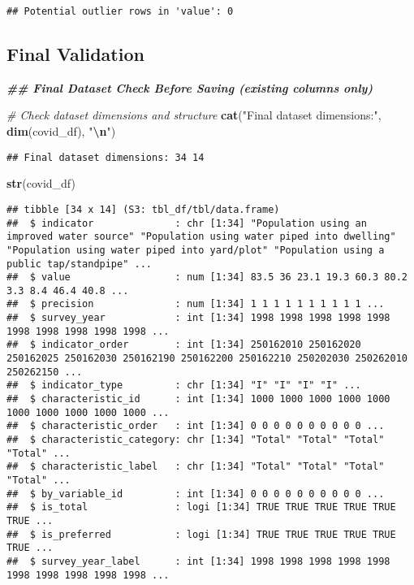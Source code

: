 \documentclass[
]{article}
\newenvironment{Shaded}{\begin{snugshade}}{\end{snugshade}}
\newcommand{\CommentTok}[1]{\textcolor[rgb]{0.56,0.35,0.01}{\textit{#1}}}
\newcommand{\DocumentationTok}[1]{\textcolor[rgb]{0.56,0.35,0.01}{\textbf{\textit{#1}}}}
\newcommand{\FunctionTok}[1]{\textcolor[rgb]{0.13,0.29,0.53}{\textbf{#1}}}
\newcommand{\NormalTok}[1]{#1}
\newcommand{\SpecialCharTok}[1]{\textcolor[rgb]{0.81,0.36,0.00}{\textbf{#1}}}
\newcommand{\StringTok}[1]{\textcolor[rgb]{0.31,0.60,0.02}{#1}}
\begin{document}
\begin{verbatim}
## Potential outlier rows in 'value': 0
\end{verbatim}

\subsection{Final Validation}\label{final-validation}

\begin{Shaded}
\begin{Highlighting}[]
\DocumentationTok{\#\# Final Dataset Check Before Saving (existing columns only)}

\CommentTok{\# Check dataset dimensions and structure}
\FunctionTok{cat}\NormalTok{(}\StringTok{"Final dataset dimensions:"}\NormalTok{, }\FunctionTok{dim}\NormalTok{(covid\_df), }\StringTok{"}\SpecialCharTok{\textbackslash{}n}\StringTok{"}\NormalTok{)}
\end{Highlighting}
\end{Shaded}

\begin{verbatim}
## Final dataset dimensions: 34 14
\end{verbatim}

\begin{Shaded}
\begin{Highlighting}[]
\FunctionTok{str}\NormalTok{(covid\_df)}
\end{Highlighting}
\end{Shaded}

\begin{verbatim}
## tibble [34 x 14] (S3: tbl_df/tbl/data.frame)
##  $ indicator              : chr [1:34] "Population using an improved water source" "Population using water piped into dwelling" "Population using water piped into yard/plot" "Population using a public tap/standpipe" ...
##  $ value                  : num [1:34] 83.5 36 23.1 19.3 60.3 80.2 3.3 8.4 46.4 40.8 ...
##  $ precision              : num [1:34] 1 1 1 1 1 1 1 1 1 1 ...
##  $ survey_year            : int [1:34] 1998 1998 1998 1998 1998 1998 1998 1998 1998 1998 ...
##  $ indicator_order        : int [1:34] 250162010 250162020 250162025 250162030 250162190 250162200 250162210 250202030 250262010 250262150 ...
##  $ indicator_type         : chr [1:34] "I" "I" "I" "I" ...
##  $ characteristic_id      : int [1:34] 1000 1000 1000 1000 1000 1000 1000 1000 1000 1000 ...
##  $ characteristic_order   : int [1:34] 0 0 0 0 0 0 0 0 0 0 ...
##  $ characteristic_category: chr [1:34] "Total" "Total" "Total" "Total" ...
##  $ characteristic_label   : chr [1:34] "Total" "Total" "Total" "Total" ...
##  $ by_variable_id         : int [1:34] 0 0 0 0 0 0 0 0 0 0 ...
##  $ is_total               : logi [1:34] TRUE TRUE TRUE TRUE TRUE TRUE ...
##  $ is_preferred           : logi [1:34] TRUE TRUE TRUE TRUE TRUE TRUE ...
##  $ survey_year_label      : int [1:34] 1998 1998 1998 1998 1998 1998 1998 1998 1998 1998 ...
\end{verbatim}
\end{document}
